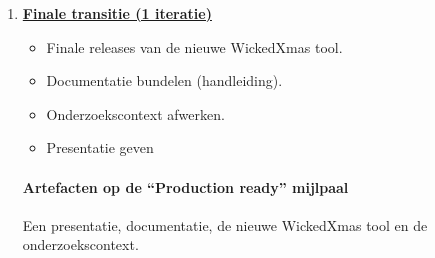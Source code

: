 \begin{enumerate}
\begin{itemize}
		\paragraph{Artefacten}
		Prototype, documentatie
	\item Iteratie 4
		\begin{itemize}
		\item Start onderzoekcontext\footnote{De inhoud en diepgang van de onderzoekscontext is nog vaag. Dat moet na de 2e iteratie
		duidelijker zijn.}
		\item WickedXmas editor ontwikkelen
		\item documentatie aanpassen
		\end{itemize}
		\paragraph{Artefacten}
		Prototype, documentatie
	\item Iteratie 5
		\begin{itemize}
		\item WickedXmas analyse tool interface ontwikkelen
		\item documentatie aanpassen
		\end{itemize}
		\paragraph{Artefacten}
		Prototype, documentatie
	\item Iteratie 6
		\begin{itemize}
		\item WickedXmas analyse tool interface ontwikkelen
		\item documentatie aanpassen
		\end{itemize}
		\paragraph{Artefacten op de ``Sufficient functionality'' mijlpaal }
		 Een release van de WickedXmas Tool zoals beoogd werd,  documentatie
	\end{itemize}
\item \underline{\textbf{Finale transitie (1 iteratie)}}
	\begin{itemize}
		\item Finale releases van de nieuwe WickedXmas tool.
		\item Documentatie bundelen (handleiding).
		\item Onderzoekscontext afwerken.
		\item Presentatie geven
	\end{itemize}
	\paragraph{Artefacten op de ``Production ready'' mijlpaal}
	Een presentatie, documentatie, de nieuwe WickedXmas tool en de onderzoekscontext.

\end{enumerate}